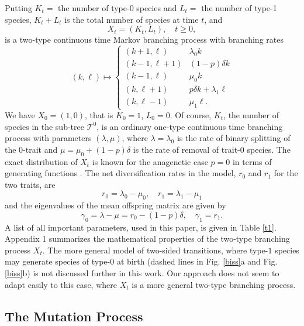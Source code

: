 \documentclass[a4paper,11pt]{article}
\theoremstyle{plain}
\theoremstyle{definition}
\numberwithin{equation}{section}
\begin{document}
Putting $K_t=$ the number of type-$0$ species and $L_t=$ the 
number of type-1 species, $K_t+L_t$ is the total
number of species at time $t$, and
\begin{equation}\label{branchingprocess}
X_t=(K_t,L_t),\quad t\ge 0,
\end{equation}
is a two-type continuous time Markov branching process with branching 
rates
\begin{equation}\label{branchingrates}
(k,\ell)\mapsto \left\{
\begin{array}{cc}
(k+1,\ell) & \lambda_0 k\\
(k-1,\ell+1) & (1-p)\delta k\\
(k-1,\ell) & \mu_0 k\\
(k,\ell+1) & p\delta k+\lambda_1 \ell\\
(k,\ell-1) & \mu_1 \ell.
\end{array}
\right.
\end{equation}
We have $X_0=(1,0)$, that is $K_0=1$, $L_0=0$.  Of
course, $K_t$, the number of species in the sub-tree $\mathcal T^0$, is an
ordinary one-type continuous time branching process with parameters
$(\lambda,\mu)$, where $\lambda=\lambda_0$ is the rate of binary
splitting of the $0$-trait and $\mu=\mu_0+(1-p)\delta$ is the rate of
removal of trait-$0$ species. The exact distribution of $X_t$ is known
for the anagenetic case $p=0$ in terms of generating functions 
\cite{antal_krapivsky}. The net diversification rates in the model, $r_0$ and
$r_1$ for the two traits, are
\begin{equation}\label{}
r_0=\lambda_0-\mu_0,\quad r_1=\lambda_1-\mu_1
\end{equation}
and the eigenvalues of the mean offspring matrix are given by 
\begin{equation}\label{netrepro}
\gamma_0=\lambda-\mu=r_0-(1-p)\delta,\quad \gamma_1=r_1.
\end{equation}
A list of all important parameters, used in this paper, is given in
Table \ref{t1}.  Appendix 1 summarizes the mathematical properties of
the two-type branching process $X_t$.  The more general model of
two-sided transitions, where type-$1$ species may generate species of
type-$0$ at birth (dashed lines in Fig. \ref{biss}a and
Fig. \ref{biss}b) is not discussed further in this work.  Our approach
does not seem to adapt easily to this case, where $X_t$ is a more
general two-type branching process.


\subsection*{The Mutation Process}
\end{document}
